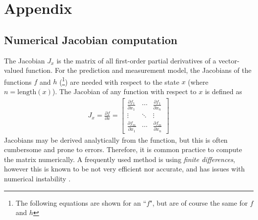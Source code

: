 \section{Appendix}

\subsection{Numerical Jacobian computation}
The Jacobian $J_x$ is the matrix of all first-order partial derivatives of a vector-valued function.
For the prediction and measurement model, the Jacobians of  the functions $f$ and $h$ (\footnote{The following equations are shown for an ``$f$", but are of course the same for $f$ and $h$}) are needed with respect to the state $x$ (where $n = \mathrm{length}(x)$).
The Jacobian of any function with respect to $x$ is defined as \cite{martins2021}
\begin{align}
    J_x = \frac{\partial f}{\partial x}
    = \begin{bmatrix}
        \frac{\partial f_1}{\partial x_1} & \cdots & \frac{\partial f_1}{\partial x_n} \\
        \vdots & \ddots & \vdots \\
        \frac{\partial f_m}{\partial x_1} & \cdots & \frac{\partial f_m}{\partial x_n}
    \end{bmatrix}
\end{align}
Jacobians may be derived analytically from the function, but this is often cumbersome and prone to errors.
Therefore, it is common practice to compute the matrix numerically.
A frequently used method is using \textit{finite differences}, however this is known to be not very efficient nor accurate, and has issues with numerical instability \cite{martins2021}.

